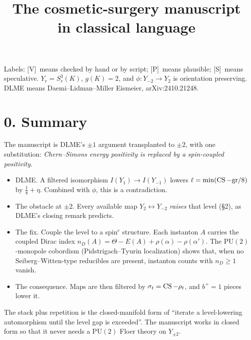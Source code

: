 \documentclass[10pt]{amsart}
\title{The cosmetic-surgery manuscript in classical language}
\date{}
\newcommand{\V}{\textsf{[V]}}\newcommand{\Pl}{\textsf{[P]}}\newcommand{\Sp}{\textsf{[S]}}
\begin{document}
\maketitle
\vspace{-2.2em}
\noindent Labels: \V\ means checked by hand or by script; \Pl\ means plausible; \Sp\ means speculative.
$Y_r=S^3_r(K)$, $g(K)=2$, and $\phi\colon Y_{-2}\to Y_2$ is orientation preserving.
DLME means Daemi--Lidman--Miller Eismeier, arXiv:2410.21248.

\section*{0. Summary}
The manuscript is DLME's $\pm1$ argument transplanted to $\pm2$, with one substitution:
\emph{Chern--Simons energy positivity is replaced by a spin-coupled positivity}.
\begin{itemize}
\item DLME. A filtered isomorphism $I(Y_1)\to I(Y_{-1})$ lowers $\ell=\min(\operatorname{CS}-\mathrm{gr}/8)$ by $\tfrac18+\eta$. Combined with $\phi$, this is a contradiction.
\item The obstacle at $\pm2$. Every available map $Y_2\leftrightarrow Y_{-2}$ \emph{raises} that level (\S2), as DLME's closing remark predicts.
\item The fix. Couple the level to a spin$^c$ structure. Each instanton $A$ carries the coupled Dirac index $n_D(A)=\Theta-E(A)+\rho(\alpha)-\rho(\alpha')$. The $\mathrm{PU}(2)$-monopole cobordism (Pidstrigach--Tyurin localization) shows that, when no Seiberg--Witten-type reducibles are present, instanton counts with $n_D\ge1$ vanish.
\item The consequence. Maps are then filtered by $\sigma_t=\operatorname{CS}-\rho_t$, and $b^+=1$ pieces lower it.
\end{itemize}
The stack plus repetition is the closed-manifold form of ``iterate a level-lowering automorphism until the level gap is exceeded''. The manuscript works in closed form so that it never needs a $\mathrm{PU}(2)$ Floer theory on $Y_{\pm2}$.
\end{document}
